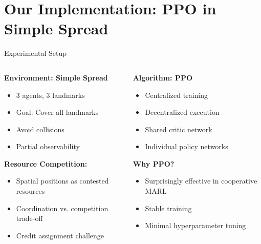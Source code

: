 \documentclass[aspectratio=169]{beamer}
\begin{document}
\section{Our Implementation: PPO in Simple Spread}

\begin{frame}{Experimental Setup}
    
    \begin{columns}
        \begin{column}{0.6\textwidth}
            \textbf{Environment: Simple Spread}
            \begin{itemize}
                \item 3 agents, 3 landmarks
                \item Goal: Cover all landmarks
                \item Avoid collisions
                \item Partial observability
            \end{itemize}
            
            \vfill
            \textbf{Resource Competition:}
            \begin{itemize}
                \item Spatial positions as contested resources
                \item Coordination vs. competition trade-off
                \item Credit assignment challenge
            \end{itemize}
        \end{column}
        \begin{column}{0.4\textwidth}
            \textbf{Algorithm: PPO}
            \begin{itemize}
                \item Centralized training
                \item Decentralized execution  
                \item Shared critic network
                \item Individual policy networks
            \end{itemize}
            
            \vfill
            \textbf{Why PPO?}
            \begin{itemize}
                \item Surprisingly effective in cooperative MARL \autocite{yu_surprising_2022}
                \item Stable training
                \item Minimal hyperparameter tuning
            \end{itemize}
        \end{column}
    \end{columns}
\end{frame}
\end{document}
